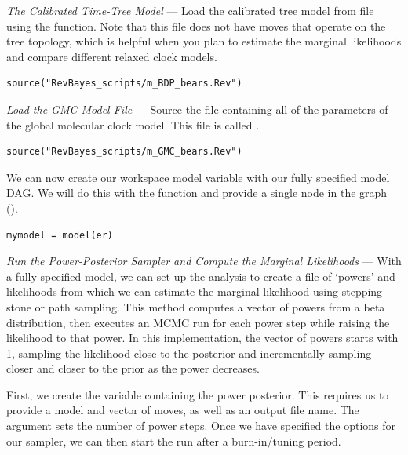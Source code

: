 \textit{The Calibrated Time-Tree Model} --- Load the calibrated tree model from file using the  function. Note that this file does not have moves that operate on the tree topology, which is helpful when you plan to estimate the marginal likelihoods and compare different relaxed clock models.
{\tt \begin{snugshade*}
\begin{lstlisting}
source("RevBayes_scripts/m_BDP_bears.Rev")
\end{lstlisting}
\end{snugshade*}}

\textit{Load the GMC Model File} --- Source the file containing all of the parameters of the global molecular clock model. This file is called {\textcolor{red}{}}.

{\tt \begin{snugshade*}
\begin{lstlisting}
source("RevBayes_scripts/m_GMC_bears.Rev")
\end{lstlisting}
\end{snugshade*}}

We can now create our workspace model variable with our fully specified model DAG. 
We will do this with the  function and provide a single node in the graph ().
{\tt \begin{snugshade*}
\begin{lstlisting}
mymodel = model(er)
\end{lstlisting}
\end{snugshade*}}

\textit{Run the Power-Posterior Sampler and Compute the Marginal Likelihoods} --- With a fully specified model, we can set up the  analysis to create a file of `powers' and likelihoods from which we can estimate the marginal likelihood using stepping-stone or path sampling. 
This method computes a vector of powers from a beta distribution, then executes an MCMC run for each power step while raising the likelihood to that power. In this implementation, the vector of powers starts with 1, sampling the likelihood close to the posterior and incrementally sampling closer and closer to the prior as the power decreases. 

First, we create the variable containing the power posterior. This requires us to provide a model and vector of moves, as well as an output file name. The  argument sets the number of power steps.
Once we have specified the options for our sampler, we can then start the run after a burn-in/tuning period.

